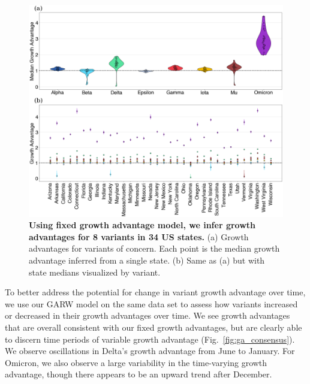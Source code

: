 \begin{figure}[h!]
  \centering
  \includegraphics[width=\linewidth]{figs/growth_advantages.png}
  \caption{\textbf{Using fixed growth advantage model, we infer growth advantages for 8 variants in 34 US states.}
  (a) Growth advantages for variants of concern. Each point is the median growth advantage inferred from a single state.
  (b) Same as (a) but with state medians visualized by variant.}
  \label{fig:growth_advantages}
\end{figure}

To better address the potential for change in variant growth advantage over time, we use our GARW model on the same data set to assess how variants increased or decreased in their growth advantages over time.
We see growth advantages that are overall consistent with our fixed growth advantages, but are clearly able to discern time periods of variable growth advantage (Fig.\ \ref{fig:ga_consensus}).
We observe oscillations in Delta's growth advantage from June to January.
For Omicron, we also observe a large variability in the time-varying growth advantage, though there appears to be an upward trend after December.

